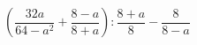 \begin{ex}[type=expression]
	\begin{condition}
		\(\left(  \dfrac{32a}{64-a^2}+\dfrac{8-a}{8+a}\right):\dfrac{8+a}{8}-\dfrac{8}{8-a}\)
	\end{condition}
\end{ex}